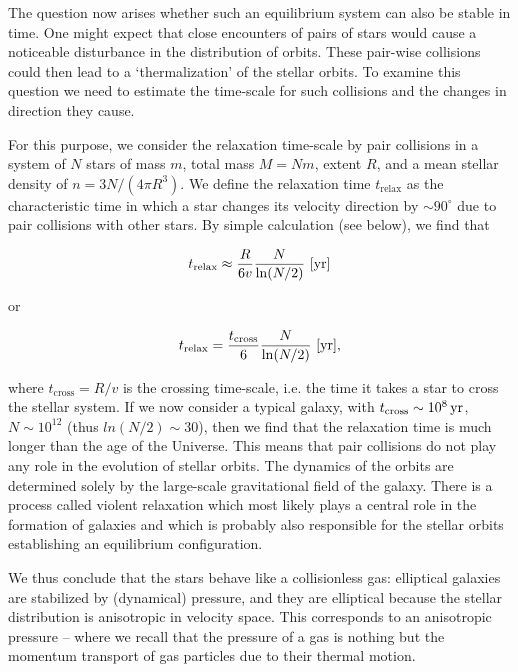 \documentclass[a4paper,11pt]{article}
\begin{document}
{\noindent}The question now arises whether such an equilibrium system can also be stable in time. One might expect that close encounters of pairs of stars would cause a noticeable disturbance in the distribution of orbits. These pair-wise collisions could then lead to a `thermalization' of the stellar orbits. To examine this question we need to estimate the time-scale for such collisions and the changes in direction they cause.

{\noindent}For this purpose, we consider the relaxation time-scale by pair collisions in a system of $N$ stars of mass $m$, total mass $M=Nm$, extent $R$, and a mean stellar density of $n=3N/(4\pi R^3)$. We define the relaxation time $t_\mathrm{relax}$ as the characteristic time in which a star changes its velocity direction by $\sim90^\circ$ due to pair collisions with other stars. By simple calculation (see below), we find that

\begin{align*}
    t_\mathrm{relax} \approx \frac{R}{6v} \frac{N}{\ln(N/2)} ~ [{\rm yr}]
\end{align*}

{\noindent}or

\begin{align*}
    t_\mathrm{relax} = \frac{t_\mathrm{cross}}{6} \frac{N}{\ln(N/2)} ~ [{\rm yr}],
\end{align*}

{\noindent}where $t_\mathrm{cross}=R/v$ is the crossing time-scale, i.e. the time it takes a star to cross the stellar system. If we now consider a typical galaxy, with $t_\mathrm{cross}\sim10^8\,{\rm yr}$, $N\sim10^{12}$ (thus $ln(N/2)\sim30$), then we find that the relaxation time is much longer than the age of the Universe. This means that pair collisions do not play any role in the evolution of stellar orbits. The dynamics of the orbits are determined solely by the large-scale gravitational field of the galaxy. There is a process called violent relaxation which most likely plays a central role in the formation of galaxies and which is probably also responsible for the stellar orbits establishing an equilibrium configuration.

{\noindent}We thus conclude that the stars behave like a collisionless gas: elliptical galaxies are stabilized by (dynamical) pressure, and they are elliptical because the stellar distribution is anisotropic in velocity space. This corresponds to an anisotropic pressure -- where we recall that the pressure of a gas is nothing but the momentum transport of gas particles due to their thermal motion.
\end{document}
